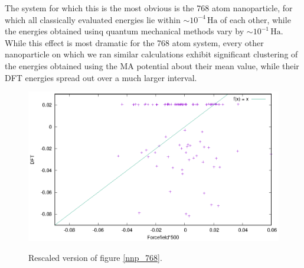 \documentclass[aps,prb,twocolumn,amsmath,amssymb,superscriptaddress,longbibliography]{revtex4-1}
\newcommand\tab[1][1cm]{\hspace*{#1}} %
\begin{document}
\tab The system for which this is the most obvious is the 768 atom nanoparticle, for which all classically evaluated energies lie within $\sim 10^{-4}\,\text{Ha}$ of each other, while the energies obtained usinq quantum mechanical methods vary by $\sim 10^{-1}\,\text{Ha}$.
While this effect is most dramatic for the 768 atom system, every other nanoparticle on which we ran similar calculations exhibit significant clustering of the energies obtained using the MA potential about their mean value, while their DFT energies spread out over a much larger interval\cite{realistic_nnp}.

\begin{figure}
\includegraphics[scale=1]{./plots/nnp_768_dilated}
\label{nnp_768_dilated}
\caption{Rescaled version of figure \ref{nnp_768}.}
\end{figure}
    
\end{document}
